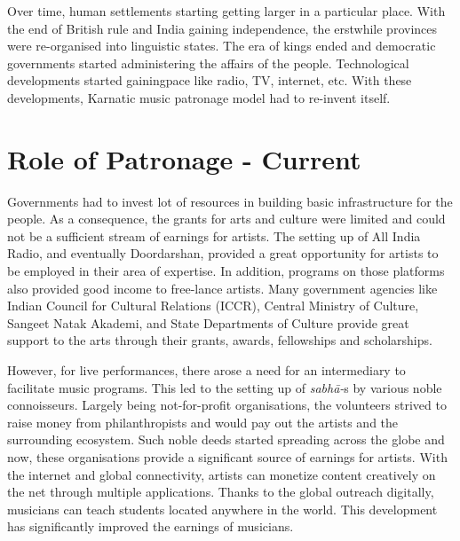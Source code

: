 Over time, human settlements starting getting larger in a particular place. With the end of British rule and India gaining independence, the erstwhile provinces were re-organised into linguistic states. The era of kings ended and democratic governments started administering the affairs of the people. Technological developments started gaining\newpage pace like radio, TV, internet, etc. With these developments, Karnatic music patronage model had to re-invent itself.

\vspace{-.3cm}

\section*{Role of Patronage - Current}

\vspace{-.2cm}

Governments had to invest lot of resources in building basic infrastructure for the people. As a consequence, the grants for arts and culture were limited and could not be a sufficient stream of earnings for artists. The setting up of All India Radio, and eventually Doordarshan, provided a great opportunity for artists to be employed in their area of expertise. In addition, programs on those platforms also provided good income to free-lance artists. Many government agencies like Indian Council for Cultural Relations (ICCR), Central Ministry of Culture, Sangeet Natak Akademi, and State Departments of Culture provide great support to the arts through their grants, awards, fellowships and scholarships.

However, for live performances, there arose a need for an intermediary to facilitate music programs. This led to the setting up of \textit{sabhā-}s by various noble connoisseurs. Largely being not-for-profit organisations, the volunteers strived to raise money from philanthropists and would pay out the artists and the surrounding ecosystem. Such noble deeds started spreading across the globe and now, these organisations provide a significant source of earnings for artists. With the internet and global connectivity, artists can monetize content creatively on the net through multiple applications. Thanks to the global outreach digitally, musicians can teach students located anywhere in the world. This development has significantly improved the earnings of musicians.

